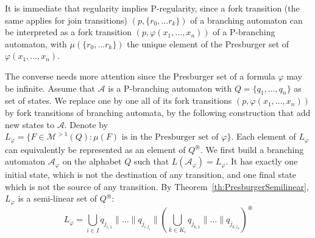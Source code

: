 \documentclass{CSML}
\begin{document}
\begin{Proof}
  It is immediate that regularity implies P-regularity, since a fork transition (the same applies for join transitions) $(p,\{r_0,\dots r_k\})$ of a branching automaton can be interpreted as a fork transition $(p,\varphi(x_1,\dots,x_n))$ of a P-branching automaton, with $\mu(\{r_0,\dots r_k\})$ the unique element of the Presburger set of $\varphi(x_1,\dots,x_n)$.

The converse needs more attention since the Presburger set of a formula $\varphi$ may be infinite. Assume that $\mathcal{A}$ is a P-branching automaton with $Q=\{q_1,\dots,q_n\}$ as set of states. We replace one by one all of its fork transitions $(p,\varphi(x_1,\dots,x_n))$ by fork transitions of branching automata, by the following construction that add new states to $\mathcal{A}$. Denote by $L_\varphi=\{ F\in\mathcal{M}^{>1}(Q) : \mu(F)\text{ is in the Presburger set of }\varphi\}$. Each element of $L_\varphi$ can equivalently be represented as an element of $Q^\circledast$. We first build a branching automaton $\mathcal{A}_\varphi$ on the alphabet $Q$ such that $L(\mathcal{A}_\varphi)=L_\varphi$. It has exactly one initial state, which is not the destination of any transition, and one final state which is not the source of any transition. By Theorem~\ref{th:PresburgerSemilinear}, $L_\varphi$ is a semi-linear set of $Q^\circledast$:
$$
L_\varphi=\bigcup_{i\in I}q_{j_{i,1}}\parallel\dots\parallel q_{j_{i,l_i}}\parallel(\bigcup_{k\in K_i} q_{j_{k,1}}\parallel\dots\parallel q_{j_{k,l_k}})^\circledast
$$

\end{Proof}
\end{document}
